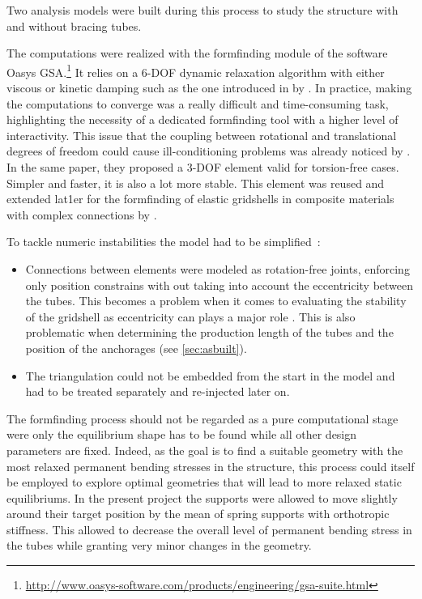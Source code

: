 Two analysis models were built during this process to study the structure with and without bracing tubes.

The computations were realized with the formfinding module of the software Oasys GSA.\footnote{\url{http://www.oasys-software.com/products/engineering/gsa-suite.html}} It relies on a 6-DOF dynamic relaxation algorithm with either viscous or kinetic damping such as the one introduced in \citeyear{Adriaenssens2000} by \citet{Adriaenssens2000}. In practice, making the computations to converge was a really difficult and time-consuming task, highlighting the necessity of a dedicated formfinding tool with a higher level of interactivity. This issue that the coupling between rotational and translational degrees of freedom could cause ill-conditioning problems was already noticed by \citet{Adriaenssens2001}. In the same paper, they proposed a 3-DOF element valid for torsion-free cases. Simpler and faster, it is also a lot more stable. This element was reused and extended lat1er for the formfinding of elastic gridshells in composite materials with complex connections by \citet{Douthe2007}.

To tackle numeric instabilities the model had to be simplified~: 
\begin{itemize}
\item Connections between elements were modeled as rotation-free joints, enforcing only position constrains with out taking into account the eccentricity between the tubes. This becomes a problem when it comes to evaluating the stability of the gridshell as eccentricity can plays a major role \cite{Lefevre2015}. This is also problematic when determining the production length of the tubes and the position of the anchorages (see \cref{sec:asbuilt}). 
\item The triangulation could not be embedded from the start in the model and had to be treated separately and re-injected later on.
\end{itemize}


The formfinding process should not be regarded as a pure computational stage were only the equilibrium shape has to be found while all other design parameters are fixed. Indeed, as the goal is to find a suitable geometry with the most relaxed permanent bending stresses in the structure, this process could itself be employed to explore optimal geometries that will lead to more relaxed static equilibriums. In the present project the supports were allowed to move slightly around their target position by the mean of spring supports with orthotropic stiffness. This allowed to decrease the overall level of permanent bending stress in the tubes while granting very minor changes in the geometry.

